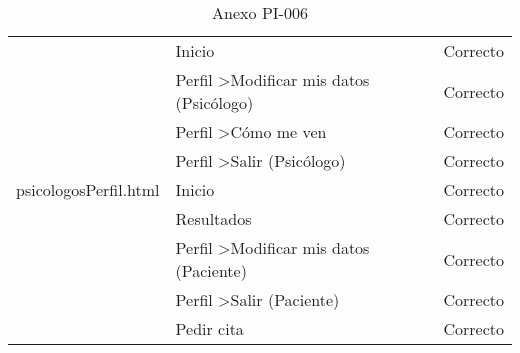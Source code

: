 \begin{table}[htpb]
\begin{tabularx}{\textwidth}{|l|X|l|}
\multirow{9}{*}{psicologosPerfil.html}    & Inicio                                              & Correcto            \\ \cline{2-3} 
                                          & Perfil \textgreater Modificar mis datos (Psicólogo) & Correcto            \\ \cline{2-3} 
                                          & Perfil \textgreater Cómo me ven                     & Correcto            \\ \cline{2-3} 
                                          & Perfil \textgreater Salir (Psicólogo)               & Correcto            \\ \cline{2-3} 
                                          & Inicio                                              & Correcto            \\ \cline{2-3} 
                                          & Resultados                                          & Correcto            \\ \cline{2-3} 
                                          & Perfil \textgreater Modificar mis datos (Paciente)  & Correcto            \\ \cline{2-3} 
                                          & Perfil \textgreater Salir (Paciente)                & Correcto            \\ \cline{2-3} 
                                          & Pedir cita                                          & Correcto            \\ \hline
\end{tabularx}
\caption{Anexo PI-006}
\end{table}


